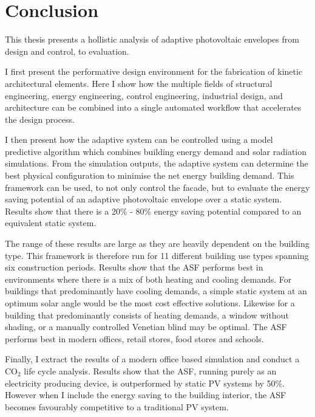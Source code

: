 
\chapter{Conclusion}
\label{ch:mainconclusion}


This thesis presents a hollistic analysis of adaptive photovoltaic envelopes from design and control, to evaluation. 

I first present the performative design environment for the fabrication of kinetic architectural elements. Here I show how the multiple fields of structural engineering, energy engineering, control engineering, industrial design, and architecture can be combined into a single automated workflow that accelerates the design process. 


I then present how the adaptive system can be controlled using a model predictive algorithm which combines building energy demand and solar radiation simulations. From the simulation outputs, the adaptive system can determine the best physical configuration to minimise the net energy building demand. This framework can be used, to not only control the facade, but to evaluate the energy saving potential of an adaptive photovoltaic envelope over a static system. Results show that there is a 20\% - 80\% energy saving potential compared to an equivalent static system. 

The range of these results are large as they are heavily dependent on the building type. This framework is therefore run for 11 different building use types spanning six construction periods. Results show that the ASF performs best in environments where there is a mix of both heating and cooling demands. For buildings that predominantly have cooling demands, a simple static system at an optimum solar angle would be the most cost effective solutions. Likewise for a building that predominantly consists of heating demands, a window without shading, or a manually controlled Venetian blind may be optimal. The ASF performs best in modern offices, retail stores, food stores and schools. 

Finally, I extract the results of a modern office based simulation and conduct a CO$_2$ life cycle analysis. Results show that the ASF, running purely as an electricity producing device, is outperformed by static PV systems by 50\%. However when I include the energy saving to the building interior, the ASF becomes favourably competitive to a traditional PV system. 


